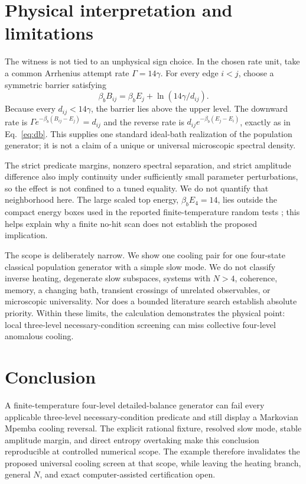 \documentclass[aps,pre,reprint,superscriptaddress,nofootinbib]{revtex4-2}
\begin{document}
\section{Physical interpretation and limitations}

The witness is not tied to an unphysical sign choice.  In the chosen rate unit, take
a common Arrhenius attempt rate $\Gamma=14\gamma$.  For every edge $i<j$, choose a
symmetric barrier satisfying
\begin{equation}
 \beta_b B_{ij}=\beta_b E_j+\ln(14\gamma/d_{ij}).
 \label{eq:barrier}
\end{equation}
Because every $d_{ij}<14\gamma$, the barrier lies above the upper level.  The
downward rate is $\Gamma e^{-\beta_b(B_{ij}-E_j)}=d_{ij}$ and the reverse rate is
$d_{ij}e^{-\beta_b(E_j-E_i)}$, exactly as in Eq.~\eqref{eq:db}.  This supplies one
standard ideal-bath realization of the population generator; it is not a claim of a
unique or universal microscopic spectral density.

The strict predicate margins, nonzero spectral separation, and strict amplitude
difference also imply continuity under sufficiently small parameter perturbations,
so the effect is not confined to a tuned equality.  We do not quantify that
neighborhood here.  The large scaled top energy, $\beta_bE_4=14$, lies outside the
compact energy boxes used in the reported finite-temperature random tests
\cite{Avitan2026,GelbwaserKlimovsky2026}; this helps explain why a finite no-hit scan
does not establish the proposed implication.

The scope is deliberately narrow.  We show one cooling pair for one four-state
classical population generator with a simple slow mode.  We do not classify inverse
heating, degenerate slow subspaces, systems with $N>4$, coherence, memory, a changing
bath, transient crossings of unrelated observables, or microscopic universality.
Nor does a bounded literature search establish absolute priority.  Within these
limits, the calculation demonstrates the physical point: local three-level
necessary-condition screening can miss collective four-level anomalous cooling.

\section{Conclusion}

A finite-temperature four-level detailed-balance generator can fail every applicable
three-level necessary-condition predicate and still display a Markovian Mpemba
cooling reversal.  The explicit rational fixture, resolved slow mode, stable amplitude
margin, and direct entropy overtaking make this conclusion reproducible at controlled
numerical scope.  The example therefore invalidates the proposed universal cooling
screen at that scope, while leaving the heating branch, general $N$, and exact
computer-assisted certification open.
\end{document}

